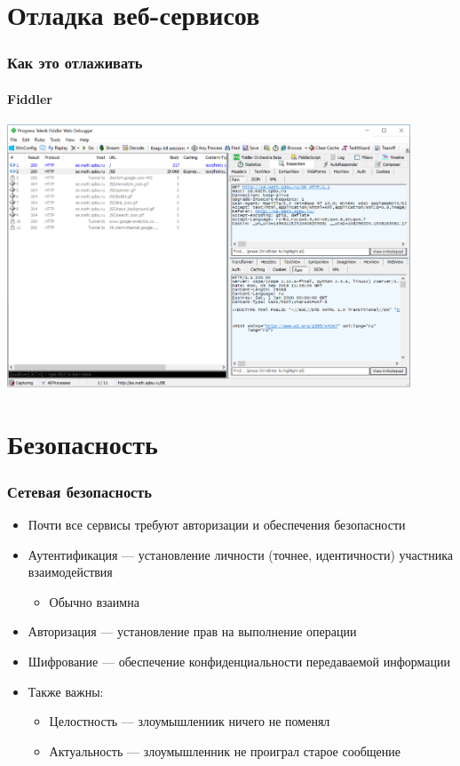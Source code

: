 \documentclass[xetex,mathserif,serif]{beamer}
\begin{document}
	\section{Отладка веб-сервисов}

	\begin{frame}
		\frametitle{Как это отлаживать}
		\framesubtitle{Fiddler}
		\begin{center}
			\includegraphics[width=0.9\textwidth]{fiddler.png}
		\end{center}
	\end{frame}

	\section{Безопасность}

	\begin{frame}
		\frametitle{Сетевая безопасность}
		\begin{itemize}
			\item Почти все сервисы требуют авторизации и обеспечения безопасности
			\item Аутентификация --- установление личности (точнее, идентичности) участника взаимодействия
			\begin{itemize}
				\item Обычно взаимна
			\end{itemize}
			\item Авторизация --- установление прав на выполнение операции
			\item Шифрование --- обеспечение конфиденциальности передаваемой информации
			\item Также важны:
			\begin{itemize}
				\item Целостность --- злоумышлениик ничего не поменял
				\item Актуальность --- злоумышленник не проиграл старое сообщение
			\end{itemize} 
		\end{itemize}
	\end{frame}
\end{document}
